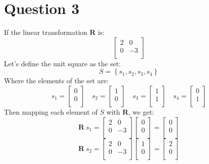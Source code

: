 \documentclass{article}
\begin{document}
\section{Question 3}
If the linear transformation $ \mathbf{R} $ is:
\[%
    \begin{bmatrix}
        2 & 0 \\
		0 & -3 \\		
    \end{bmatrix}
\]%
Let's define the unit square as the set:
\[%
    S = \left\{ s_1, s_2, s_3, s_4 \right\}
\]%
Where the elements of the set are:
\[%
    s_1 = 
    \begin{bmatrix}
        0 \\ 0 \\
    \end{bmatrix}
    \quad
    s_2 =
    \begin{bmatrix}
        1 \\ 0 \\
    \end{bmatrix}
    \quad
    s_3 = 
    \begin{bmatrix}
        1 \\ 1 \\
    \end{bmatrix}
    \quad
    s_4 = 
    \begin{bmatrix}
        0 \\ 1 \\
    \end{bmatrix}
\]%
Then mapping each element of $ S $ with $ \mathbf{R} $, we get:
\[%
    \mathbf{R} \ s_1 = 
    \begin{bmatrix}
        2 & 0 \\
		0 & -3 \\		
    \end{bmatrix}
    \begin{bmatrix}
        0 \\ 0 \\
    \end{bmatrix}
    =
    \begin{bmatrix}
        0 \\ 0 \\
    \end{bmatrix}
\]%
\[%
    \mathbf{R} \ s_2 = 
    \begin{bmatrix}
        2 & 0 \\
		0 & -3 \\		
    \end{bmatrix}
    \begin{bmatrix}
        1 \\ 0 \\
    \end{bmatrix}
    = 
    \begin{bmatrix}
        2 \\ 0 \\
    \end{bmatrix}
\]%
\end{document}
